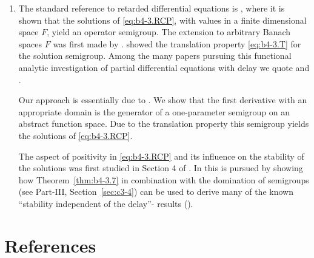 \begin{enumerate}[label=\emph{Section 4.\arabic*:}, wide, itemsep=1ex]
\item The standard reference to retarded differential equations is \textcite{hale:1977}, where it is shown that the solutions of \eqref{eq:b4-3.RCP}, with values in a finite dimensional space $F$, yield an operator semigroup. 
The extension to arbitrary Banach spaces $F$ was first made by \textcite{traviswebb:1974}. 
\textcite{plant:1977} showed the translation property \eqref{eq:b4-3.T} for the solution semigroup. 
Among the many papers pursuing this functional analytic investigation of partial differential equations with delay we quote \textcite{diblasioetal:1984} and \textcite{kunischschappacher:1983}.

Our approach is essentially due to \textcite{kerscher:1986}. 
We show that the first derivative with an appropriate domain is the generator of a one-parameter semigroup on an abstract function space. 
Due to the translation property this semigroup yields the solutions of \eqref{eq:b4-3.RCP}.

The aspect of positivity in \eqref{eq:b4-3.RCP} and its influence on the stability of the solutions was first studied in Section 4 of \textcite{kerschernagel:1984}. 
In \textcite{kerscher:1986} this is pursued by showing how Theorem~\ref{thm:b4-3.7} in combination with the domination of semigroups (see Part-III, Section~\ref{sec:c3-4}) can be used to derive many of the known \enquote{stability independent of the delay}- results (\eg  \textcite{cookeferreira:1983}).
\end{enumerate}
\section*{References}
{\RaggedRight
  \printbibliography[heading=none]
 }

